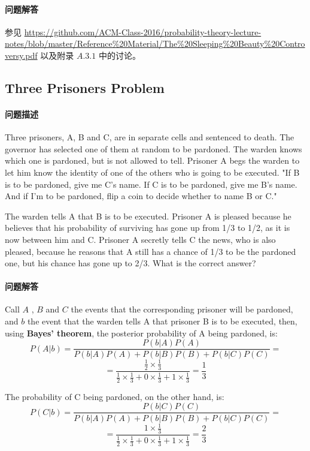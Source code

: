 		\paragraph{问题解答}
			参见 \url{https://github.com/ACM-Class-2016/probability-theory-lecture-notes/blob/master/Reference%20Material/The%20Sleeping%20Beauty%20Controversy.pdf} 以及附录 $A.3.1$ 中的讨论。

	\subsection{Three Prisoners Problem}
		\paragraph{问题描述}
		Three prisoners, A, B and C, are in separate cells and sentenced to death. The governor has selected one of them at random to be pardoned. The warden knows which one is pardoned, but is not allowed to tell. Prisoner A begs the warden to let him know the identity of one of the others who is going to be executed. "If B is to be pardoned, give me C's name. If C is to be pardoned, give me B's name. And if I'm to be pardoned, flip a coin to decide whether to name B or C."
		\par \indent
		The warden tells A that B is to be executed. Prisoner A is pleased because he believes that his probability of surviving has gone up from 1/3 to 1/2, as it is now between him and C. Prisoner A secretly tells C the news, who is also pleased, because he reasons that A still has a chance of 1/3 to be the pardoned one, but his chance has gone up to 2/3. What is the correct answer?

		\paragraph{问题解答}
		Call  $A$ , $B$ and $C$ the events that the corresponding prisoner will be pardoned, and $b$ the event that the warden tells A that prisoner B is to be executed, then, using \textbf{Bayes' theorem}, the posterior probability of A being pardoned, is:
		$$
			P(A|b) = \frac{P(b|A)P(A)}{P(b|A)P(A) + P(b|B)P(B) + P(b|C)P(C)} =
		$$
		$$
			= \frac{ \frac{1}{2}\times\frac{1}{3} }{ \frac{1}{2}\times\frac{1}{3} + 0\times\frac{1}{3} + 1\times\frac{1}{3} } = \frac{1}{3}
		$$
		\par The probability of C being pardoned, on the other hand, is:
		$$
			P(C|b) = \frac{P(b|C)P(C)}{P(b|A)P(A) + P(b|B)P(B) + P(b|C)P(C)} =
		$$
		$$
			= \frac{ 1\times\frac{1}{3} }{ \frac{1}{2}\times\frac{1}{3} + 0\times\frac{1}{3} + 1\times\frac{1}{3} } = \frac{2}{3}
		$$

